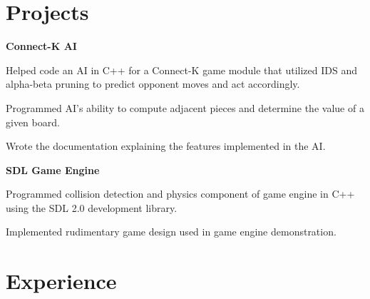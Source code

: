 \documentclass[10pt, letterpaper, sans]{moderncv} %
\begin{document}
\section{Projects}
\textbf{Connect-K AI}
\begin{itemize}
{
\item Helped code an AI in C++ for a Connect-K game module that utilized IDS and alpha-beta pruning to predict opponent moves and act accordingly.
\item Programmed AI's ability to compute adjacent pieces and determine the value of a given board.
\item Wrote the documentation explaining the features implemented in the AI.
}
\end{itemize}

\textbf{SDL Game Engine}
\begin{itemize}
{
\item Programmed collision detection and physics component of game engine in C++ using the SDL 2.0 development library.
\item Implemented rudimentary game design used in game engine demonstration.
}

\end{itemize}

\section{Experience}

\end{document}
